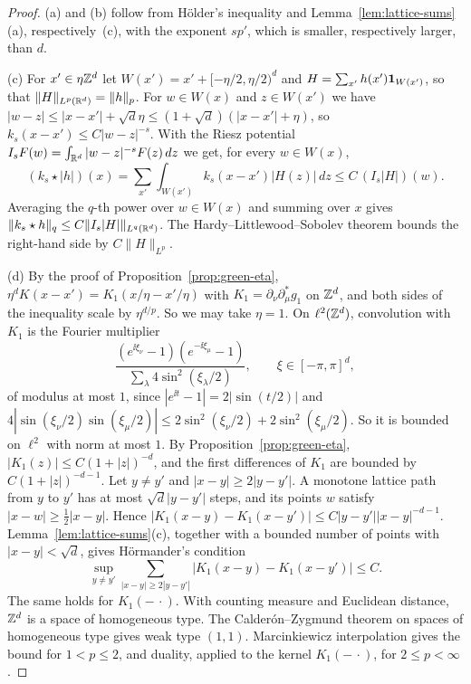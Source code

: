\begin{proof}
(a) and (b) follow from H\"older's inequality and Lemma~\ref{lem:lattice-sums}(a), respectively~(c), with the exponent $sp'$, which is smaller, respectively larger, than $d$.

(c) For $x'\in\eta\mathbb Z^d$ let $W(x')=x'+[-\eta/2,\eta/2)^d$ and $H=\sum_{x'}h(x')\mathbf 1_{W(x')}$, so that $\|H\|_{L^p(\mathbb R^d)}=\|h\|_p$. For $w\in W(x)$ and $z\in W(x')$ we have $|w-z|\le|x-x'|+\sqrt d\eta\le(1+\sqrt d)(|x-x'|+\eta)$, so $k_s(x-x')\le C|w-z|^{-s}$. With the Riesz potential $I_sF(w)=\int_{\mathbb R^d}|w-z|^{-s}F(z)\,dz$ we get, for every $w\in W(x)$,
\[
(k_s\star|h|)(x)=\sum_{x'}\int_{W(x')}k_s(x-x')|H(z)|\,dz\le C\,(I_s|H|)(w).
\]
Averaging the $q$-th power over $w\in W(x)$ and summing over $x$ gives $\|k_s\star h\|_q\le C\|I_s|H|\|_{L^q(\mathbb R^d)}$. The Hardy--Littlewood--Sobolev theorem \cite[Ch.~V, \S1.2, Theorem~1]{Stein70} bounds the right-hand side by $C\|H\|_{L^p}$.

(d) By the proof of Proposition~\ref{prop:green-eta}, $\eta^dK(x-x')=K_1(x/\eta-x'/\eta)$ with $K_1=\partial_\nu\partial^*_\mu g_1$ on $\mathbb Z^d$, and both sides of the inequality scale by $\eta^{d/p}$. So we may take $\eta=1$. On $\ell^2(\mathbb Z^d)$, convolution with $K_1$ is the Fourier multiplier
\[
\frac{(e^{\ii\xi_\nu}-1)(e^{-\ii\xi_\mu}-1)}{\sum_\lambda4\sin^2(\xi_\lambda/2)},\qquad\xi\in[-\pi,\pi]^d,
\]
of modulus at most $1$, since $|e^{\ii t}-1|=2|\sin(t/2)|$ and $4|\sin(\xi_\nu/2)\sin(\xi_\mu/2)|\le2\sin^2(\xi_\nu/2)+2\sin^2(\xi_\mu/2)$. So it is bounded on $\ell^2$ with norm at most $1$. By Proposition~\ref{prop:green-eta}, $|K_1(z)|\le C(1+|z|)^{-d}$, and the first differences of $K_1$ are bounded by $C(1+|z|)^{-d-1}$. Let $y\ne y'$ and $|x-y|\ge2|y-y'|$. A monotone lattice path from $y$ to $y'$ has at most $\sqrt d|y-y'|$ steps, and its points $w$ satisfy $|x-w|\ge\frac12|x-y|$. Hence $|K_1(x-y)-K_1(x-y')|\le C|y-y'||x-y|^{-d-1}$. Lemma~\ref{lem:lattice-sums}(c), together with a bounded number of points with $|x-y|<\sqrt d$, gives H\"ormander's condition
\[
\sup_{y\ne y'}\sum_{|x-y|\ge2|y-y'|}|K_1(x-y)-K_1(x-y')|\le C .
\]
The same holds for $K_1(-\,\cdot)$. With counting measure and Euclidean distance, $\mathbb Z^d$ is a space of homogeneous type. The Calder\'on--Zygmund theorem on spaces of homogeneous type \cite[Ch.~I]{Stein93} gives weak type $(1,1)$. Marcinkiewicz interpolation gives the bound for $1<p\le2$, and duality, applied to the kernel $K_1(-\,\cdot)$, for $2\le p<\infty$.
\end{proof}

